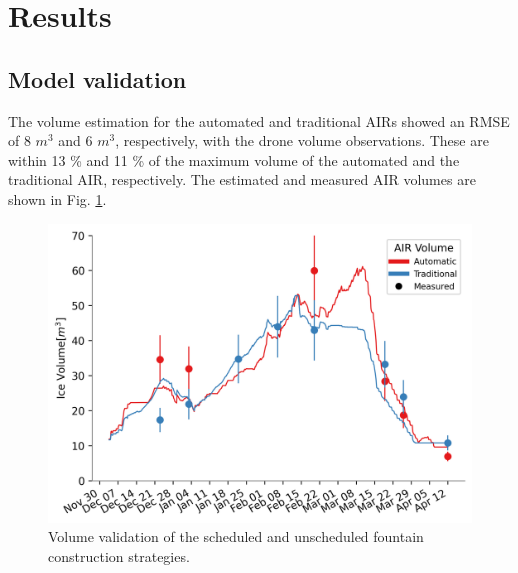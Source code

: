 \documentclass[tc, manuscript]{copernicus}
\begin{document}
\section{Results}

\subsection{Model validation}

The volume estimation for the automated and traditional AIRs showed an RMSE of 8 $m^3$ and 6 $m^3$, respectively, with the drone
volume observations. These are within 13 \% and 11 \% of the maximum volume of the automated and
the traditional AIR, respectively. The estimated and measured AIR volumes are shown in Fig. \ref{fig:validation}.  

\begin{figure}[htb] \includegraphics[width=12cm] {Figures/validation.png} 
  \caption{Volume validation of the scheduled and unscheduled fountain construction strategies.} 
  \label{fig:validation} \end{figure}
\end{document}
